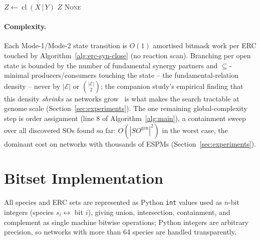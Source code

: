 \documentclass[11pt]{article}
\theoremstyle{plain}
\theoremstyle{remark}
\newcommand{\cl}{\operatorname{cl}}
\newcommand{\req}{\operatorname{req}}
\newcommand{\E}{\mathcal{E}}
\newcommand{\SOgen}{\mathit{SO}^{\mathrm{gen}}}
\begin{document}
\begin{algorithm}[t]
\caption{LatentJoin($X$, $Y$)}\label{alg:latent}
\begin{algorithmic}[1]
\State $Z \leftarrow \cl(X\,|\,Y)$
\If{$\req(Z)=\emptyset$ and $Z$ is connected}
  \State \Return $Z$
\Else
  \State \Return \textsc{None}
\EndIf
\end{algorithmic}
\end{algorithm}

\paragraph{Complexity.} Each Mode-1/Mode-2 state transition is $O(1)$
amortised bitmask work per ERC touched by Algorithm~\ref{alg:erc-syn-close}
(no reaction scan). Branching per open state is bounded by the number of
fundamental synergy partners and $\subseteq$-minimal producers/consumers
touching the state -- the fundamental-relation density -- never by $|\E|$
or $\binom{|\E|}{2}$; the companion study's empirical finding that this
density \emph{shrinks} as networks grow~\cite{BMBcompanion} is what makes
the search tractable at genome scale (Section~\ref{sec:experiments}). The
one remaining global-complexity step is order assignment
(line 8 of Algorithm~\ref{alg:main}), a containment sweep over all
discovered SOs found so far: $O(|\SOgen|^2)$ in the worst case, the
dominant cost on networks with thousands of ESPMs
(Section~\ref{sec:experiments}).

\section{Bitset Implementation}\label{sec:implementation}

All species and ERC sets are represented as Python \texttt{int} values
used as $n$-bit integers (species $s_i\leftrightarrow$ bit $i$), giving
union, intersection, containment, and complement as single machine
bitwise operations; Python integers are arbitrary precision, so networks
with more than 64 species are handled transparently.
\end{document}

